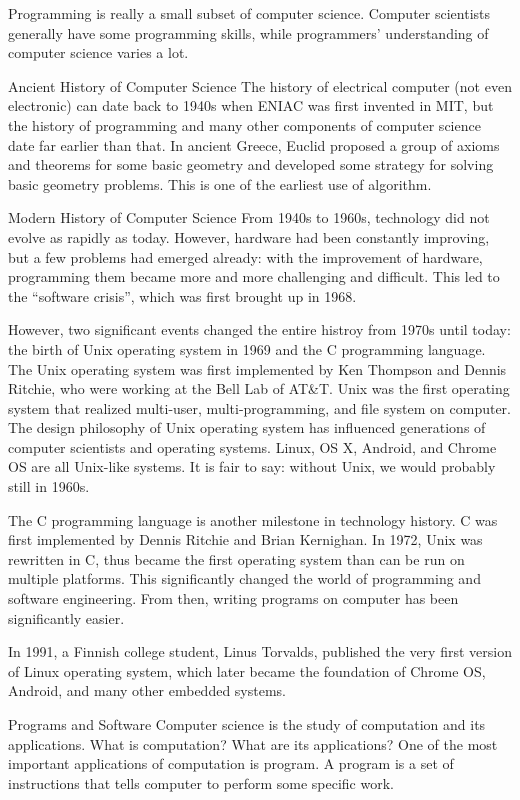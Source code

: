 \documentclass[../main.tex]{subfiles}
\begin{document}
Programming is really a small subset of computer science. Computer scientists
generally have some programming skills, while programmers' understanding of
computer science varies a lot.


Ancient History of Computer Science
The history of electrical computer (not even electronic) can date back to 1940s
when ENIAC was first invented in MIT, but the history of programming and many
other components of computer science date far earlier than that. In ancient
Greece, Euclid proposed a group of axioms and theorems for some basic geometry
and developed some strategy for solving basic geometry problems. This is one of
the earliest use of algorithm.

Modern History of Computer Science
From 1940s to 1960s, technology did not evolve as rapidly as today. However,
hardware had been constantly improving, but a few problems had emerged already:
with the improvement of hardware, programming them became more and more
challenging and difficult. This led to the ``software crisis'', which was first
brought up in 1968.

However, two significant events changed the entire histroy from 1970s until
today: the birth of Unix operating system in 1969 and the C programming language.
The Unix operating system was first implemented by Ken Thompson and Dennis
Ritchie, who were working at the Bell Lab of AT\&T. Unix was the first operating
system that realized multi-user, multi-programming, and file system on computer.
The design philosophy of Unix operating system has influenced generations of
computer scientists and operating systems. Linux, OS X, Android, and Chrome OS
are all Unix-like systems. It is fair to say: without Unix, we would probably
still in 1960s.

The C programming language is another milestone in technology history. C was
first implemented by Dennis Ritchie and Brian Kernighan. In 1972, Unix was
rewritten in C, thus became the first operating system than can be run on
multiple platforms. This significantly changed the world of programming and
software engineering. From then, writing programs on computer has been
significantly easier.

In 1991, a Finnish college student, Linus Torvalds, published the very first
version of Linux operating system, which later became the foundation of Chrome
OS, Android, and many other embedded systems.

Programs and Software
Computer science is the study of computation and its applications. What is
computation? What are its applications? One of the most important applications
of computation is program. A program is a set of instructions that tells computer
to perform some specific work.
\end{document}
